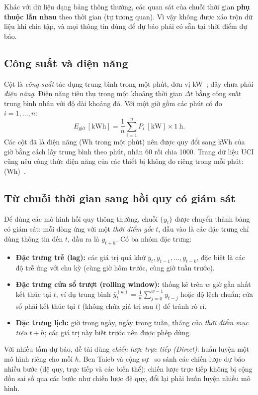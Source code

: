 \documentclass[../main.tex]{subfiles}
\begin{document}
Khác với dữ liệu dạng bảng thông thường, các quan sát của chuỗi thời gian \textbf{phụ thuộc lẫn nhau} theo thời gian (tự tương quan). Vì vậy không được xáo trộn dữ liệu khi chia tập, và mọi thông tin dùng để dự báo phải có sẵn tại thời điểm dự báo.

\subsection{Công suất và điện năng}
Cột  là \textit{công suất} tác dụng trung bình trong một phút, đơn vị kW~\cite{hebrail2006uci}; đây chưa phải \textit{điện năng}. Điện năng tiêu thụ trong một khoảng thời gian $\Delta t$ bằng công suất trung bình nhân với độ dài khoảng đó. Với một giờ gồm các phút có đo $i = 1, \ldots, n$:
\begin{equation}
E_{\text{giờ}}\ [\text{kWh}] = \frac{1}{n}\sum_{i=1}^{n} P_i\ [\text{kW}] \times 1\ \text{h}.
\label{eq:dien-nang}
\end{equation}
Các cột  đã là điện năng (Wh trong một phút) nên được quy đổi sang kWh của giờ bằng cách lấy trung bình theo phút, nhân 60 rồi chia 1000. Trang dữ liệu UCI cũng nêu công thức điện năng của các thiết bị không đo riêng trong mỗi phút:  (Wh)~\cite{hebrail2006uci}.

\subsection{Từ chuỗi thời gian sang hồi quy có giám sát}
Để dùng các mô hình hồi quy thông thường, chuỗi $\{y_t\}$ được chuyển thành bảng có giám sát: mỗi dòng ứng với một \textit{thời điểm gốc} $t$, đầu vào là các đặc trưng chỉ dùng thông tin đến $t$, đầu ra là $y_{t+h}$. Có ba nhóm đặc trưng:
\begin{itemize}
    \item \textbf{Đặc trưng trễ (lag):} các giá trị quá khứ $y_t, y_{t-1}, \ldots, y_{t-k}$, đặc biệt là các độ trễ ứng với chu kỳ (cùng giờ hôm trước, cùng giờ tuần trước).
    \item \textbf{Đặc trưng cửa sổ trượt (rolling window):} thống kê trên $w$ giờ gần nhất kết thúc tại $t$, ví dụ trung bình $\bar{y}^{(w)}_t = \frac{1}{w}\sum_{j=0}^{w-1} y_{t-j}$ hoặc độ lệch chuẩn; cửa sổ phải kết thúc tại $t$ (không chứa giá trị sau $t$) để tránh rò rỉ.
    \item \textbf{Đặc trưng lịch:} giờ trong ngày, ngày trong tuần, tháng của \textit{thời điểm mục tiêu} $t+h$; các giá trị này biết trước nên được phép dùng.
\end{itemize}
Với nhiều tầm dự báo, đề tài dùng \textit{chiến lược trực tiếp (Direct)}: huấn luyện một mô hình riêng cho mỗi $h$. Ben Taieb và cộng sự~\cite{bentaieb2012review} so sánh các chiến lược dự báo nhiều bước (đệ quy, trực tiếp và các biến thể); chiến lược trực tiếp không bị cộng dồn sai số qua các bước như chiến lược đệ quy, đổi lại phải huấn luyện nhiều mô hình.
\end{document}
